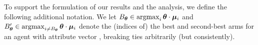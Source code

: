 


To support the formulation of our results and the analysis,
we define the following additional notation.
We let
$B_{\bm{\theta}} \in \mathop{\mathrm{argmax}}_i \bm{\theta} \cdot \bm{\mu}_{i}$
and
$ B'_{\bm{\theta}} \in \mathop{\mathrm{argmax}}_{i \neq B_{\bm{\theta}}} \bm{\theta} \cdot \bm{\mu}_{i}$
denote the (indices of) the best and second-best arms for an agent
with attribute vector \AgV,
breaking ties arbitrarily (but consistently).


